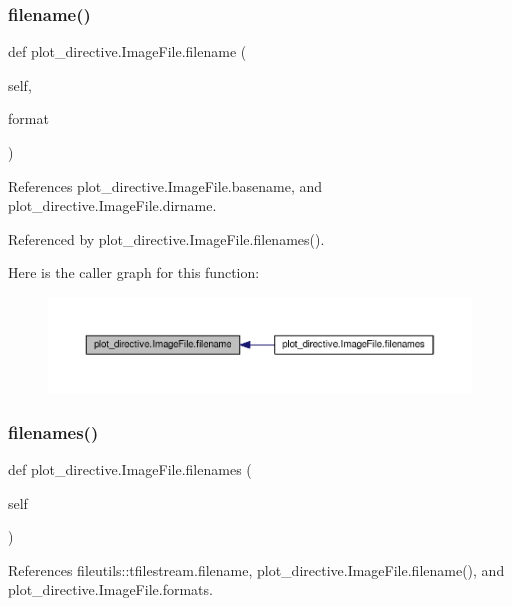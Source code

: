 \subsubsection{\texorpdfstring{filename()}{filename()}}
{\footnotesize\ttfamily def plot\+\_\+directive.\+Image\+File.\+filename (\begin{DoxyParamCaption}\item[{}]{self,  }\item[{}]{format }\end{DoxyParamCaption})}



References plot\+\_\+directive.\+Image\+File.\+basename, and plot\+\_\+directive.\+Image\+File.\+dirname.



Referenced by plot\+\_\+directive.\+Image\+File.\+filenames().

Here is the caller graph for this function\+:
\nopagebreak
\begin{figure}[H]
\begin{center}
\leavevmode
\includegraphics[width=350pt]{classplot__directive_1_1ImageFile_ac0eb49bf3591003e4ffb6cca0c626eda_icgraph}
\end{center}
\end{figure}
\mbox{\label{classplot__directive_1_1ImageFile_a1497c4d40e8500e207de9e483d639f39}} 
\subsubsection{\texorpdfstring{filenames()}{filenames()}}
{\footnotesize\ttfamily def plot\+\_\+directive.\+Image\+File.\+filenames (\begin{DoxyParamCaption}\item[{}]{self }\end{DoxyParamCaption})}



References fileutils\+::tfilestream.\+filename, plot\+\_\+directive.\+Image\+File.\+filename(), and plot\+\_\+directive.\+Image\+File.\+formats.

